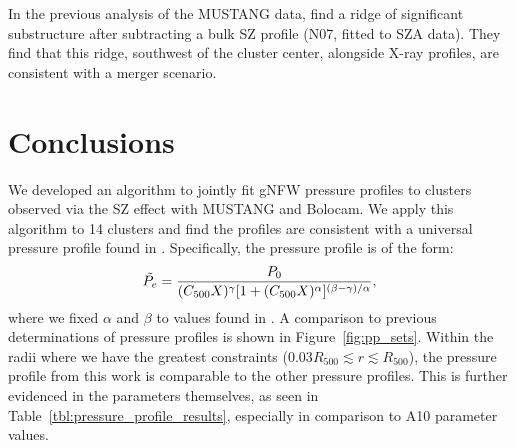 \documentclass[iop,numberedappendix,apj]{emulateapj}
\begin{document}

In the previous analysis of the MUSTANG data, \citet{korngut2011} find a ridge of significant substructure after 
subtracting a bulk SZ profile (N07, fitted to SZA data). They find that this ridge, southwest of the cluster
center, alongside X-ray profiles, are consistent with a merger scenario. 


\section{Conclusions}
\label{sec:conclusions}

We developed an algorithm to jointly fit gNFW pressure profiles to clusters observed via the SZ
effect with MUSTANG and Bolocam. We apply this algorithm to 14 clusters and find the profiles are 
consistent with a universal pressure profile found in \citet{arnaud2010}. Specifically, the 
pressure profile is of the form:
\begin{equation*}
  \Tilde{P_e} = \frac{P_0}{(C_{500} X)^{\gamma} [1 + (C_{500} X)^{\alpha}]^{(\beta - \gamma)/\alpha}},
\end{equation*}
where we fixed $\alpha$ and $\beta$ to values found in \citet{arnaud2010}. A comparison to previous
determinations of pressure profiles is shown in Figure~\ref{fig:pp_sets}. Within the radii where we
have the greatest constraints ($0.03 R_{500} \lesssim r \lesssim R_{500}$), the pressure profile from this
work is comparable to the other pressure profiles. This is further evidenced in the parameters themselves,
as seen in Table~\ref{tbl:pressure_profile_results}, especially in comparison to A10 parameter values.
\end{document}
